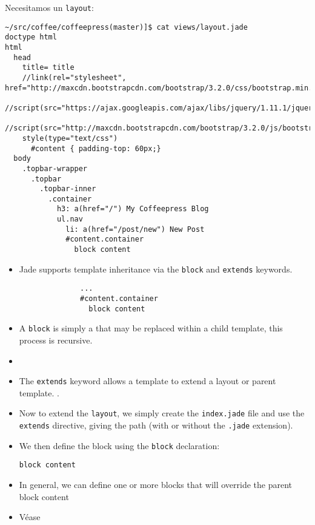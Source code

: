 Necesitamos un \verb|layout|:
\begin{verbatim}
~/src/coffee/coffeepress(master)]$ cat views/layout.jade 
doctype html
html
  head
    title= title
    //link(rel="stylesheet", href="http://maxcdn.bootstrapcdn.com/bootstrap/3.2.0/css/bootstrap.min.css")
    //script(src="https://ajax.googleapis.com/ajax/libs/jquery/1.11.1/jquery.min.js")
    //script(src="http://maxcdn.bootstrapcdn.com/bootstrap/3.2.0/js/bootstrap.min.js")
    style(type="text/css")
      #content { padding-top: 60px;}
  body
    .topbar-wrapper
      .topbar
        .topbar-inner
          .container
            h3: a(href="/") My Coffeepress Blog
            ul.nav
              li: a(href="/post/new") New Post
              #content.container
                block content
\end{verbatim}
\begin{itemize}
\item
Jade supports template inheritance via the \verb|block| and \verb|extends| keywords. 
\begin{verbatim}
              ...
              #content.container
                block content
\end{verbatim}
\item A \verb|block| is simply a  
that may be replaced within a child
template, this process is recursive.
\item
{}
\end{itemize}

\begin{itemize}
\item
The \verb|extends| keyword allows a template to extend a layout or parent template. 
.
\item
Now to extend the \verb|layout|, we simply create 
the \verb|index.jade|
file and use the \verb|extends| directive, giving the path 
(with or without the \verb|.jade| extension). 
\item
We then define  the block  using the 
\verb|block| declaration:
\begin{verbatim}
block content
\end{verbatim}
\item
In general, we can define
one or more blocks that will
override the parent block content
\item
Véase
\end{itemize}

